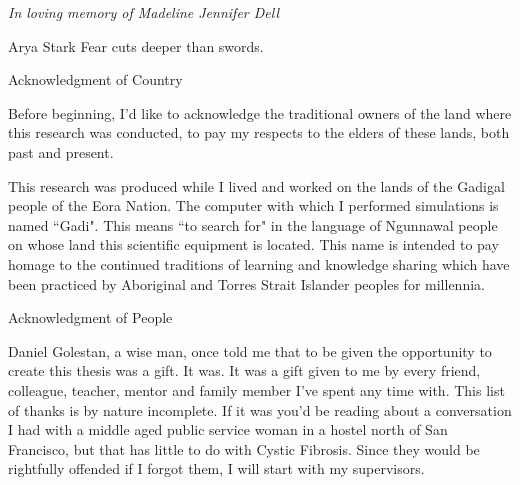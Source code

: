 \newpage


\thispagestyle{empty}


\begin{center}
	\vspace*{\fill}
\textit {In loving memory of Madeline Jennifer Dell} \\
	\vspace*{\fill}
\end{center}

\begin{chapquote}{Arya Stark \cite{martin1997}}
Fear cuts deeper than swords.
\end{chapquote}

\clearpage


\begin{center}
\begin{Large}
\begin{bfseries}
Acknowledgment of Country
\end{bfseries}
\end{Large}
\end{center}
Before beginning, I'd like to acknowledge the traditional owners of the land where this research was conducted, to pay my respects to the elders of these lands, both past and present. 

This research was produced while I lived and worked on the lands of the Gadigal people of the Eora Nation. The computer with which I performed simulations is named ``Gadi". This means ``to search for" in the language of Ngunnawal people on whose land this scientific equipment is located. This name is intended to pay homage to the continued traditions of learning and knowledge sharing which have been practiced by Aboriginal and Torres Strait Islander peoples for millennia. \newline

\begin{center}
\begin{Large}
\begin{bfseries}
Acknowledgment of People
\end{bfseries}
\end{Large}
\end{center}
Daniel Golestan, a wise man, once told me that to be given the opportunity to create this thesis was a gift. It was. It was a gift given to me by every friend, colleague, teacher, mentor and family member I've spent any time with. This list of thanks is by nature incomplete. If it was you'd be reading about a conversation I had with a middle aged public service woman in a hostel north of San Francisco, but that has little to do with Cystic Fibrosis. Since they would be rightfully offended if I forgot them, I will start with my supervisors.

